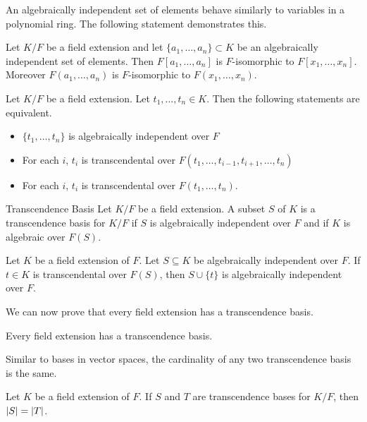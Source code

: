 \documentclass[a4paper]{article}
\begin{document}
An algebraically independent set of elements behave similarly to variables in a polynomial ring. The following statement demonstrates this. 

\begin{lmm}{}{} Let $K/F$ be a field extension and let $\{a_1,\dots,a_n\}\subset K$ be an algebraically independent set of elements. Then $F[a_1,\dots,a_n]$ is $F$-isomorphic to $F[x_1,\dots,x_n]$. Moreover $F(a_1,\dots,a_n)$ is $F$-isomorphic to $F(x_1,\dots,x_n)$. 
\end{lmm}

\begin{prp}{}{} Let $K/F$ be a field extension. Let $t_1,\dots,t_n\in K$. Then the following statements are equivalent. 
\begin{itemize}
\item $\{t_1,\dots,t_n\}$ is algebraically independent over $F$
\item For each $i$, $t_i$ is transcendental over $F(t_1,\dots,t_{i-1},t_{i+1},\dots,t_n)$
\item For each $i$, $t_i$ is transcendental over $F(t_1,\dots,t_n)$. 
\end{itemize}
\end{prp}

\begin{defn}{Transcendence Basis}{} Let $K/F$ be a field extension. A subset $S$ of $K$ is a transcendence basis for $K/F$ if $S$ is algebraically independent over $F$ and if $K$ is algebraic over $F(S)$. 
\end{defn}

\begin{lmm}{}{} Let $K$ be a field extension of $F$. Let $S\subseteq K$ be algebraically independent over $F$. If $t\in K$ is transcendental over $F(S)$, then $S\cup\{t\}$ is algebraically independent over $F$. 
\end{lmm}

We can now prove that every field extension has a transcendence basis. 

\begin{prp}{}{} Every field extension has a transcendence basis. 
\end{prp}

Similar to bases in vector spaces, the cardinality of any two transcendence basis is the same. 

\begin{thm}{}{} Let $K$ be a field extension of $F$. If $S$ and $T$ are transcendence bases for $K/F$, then $\abs{S}=\abs{T}$. 
\end{thm}
\end{document}
